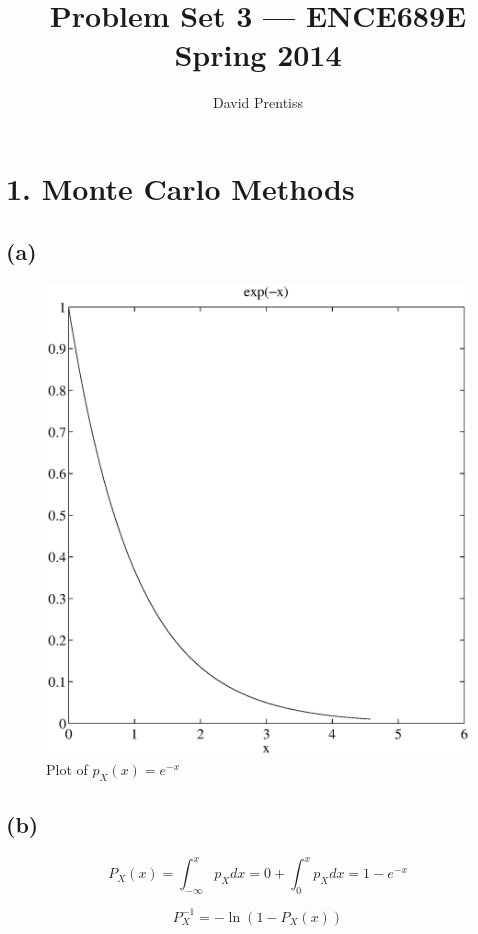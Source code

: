 \documentclass[fleqn, letterpaper]{tufte-handout}
\title{Problem Set 3 --- ENCE689E Spring 2014}
\author{David Prentiss}
\begin{document}
\maketitle

\section{1. Monte Carlo Methods}
\subsection{(a)}
\begin{figure}
    \includegraphics[width=\textwidth]{problem1a}
    \caption{Plot of $p_X(x)=e^{-x}$}
    \label{exprnd}
\end{figure}

\subsection{(b)}
    \[
    P_X(x) = \int_{-\infty}^x p_X dx
     = 0 + \int_0^x p_X dx = 1 - e^{-x}
    \]

\[
P^{-1}_X = -\ln(1-P_X(x))
\]
\end{document}
